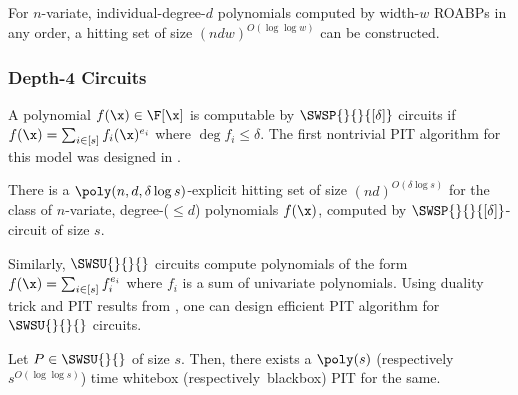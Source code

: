\begin{theorem} \label{thm:roabp-blackbox-pit}
For $n$-variate, individual-degree-$d$ polynomials computed by width-$w$ ROABPs in any order, a hitting set of size $(ndw)^{O(\log \log w)}$ can be constructed.
\end{theorem}

\subsubsection*{Depth-4 Circuits}

A polynomial $f(\x) \in \F[\x]$ is computable by $\SWSP{}{}{[\delta]}$ circuits if $ f(\x) = \sum_{i \in [s]} f_i(\x)^{e_i}$ where $\deg f_i \leq \delta$. The first nontrivial PIT algorithm for this model was designed in \cite{forbes2015deterministic}.

\begin{theorem} \label{thm:swsp-hs}
There is a $\poly(n,d, \delta \log s)$-explicit hitting set of size $(nd)^{O(\delta \log s)}$ for the class of $n$-variate, degree-($\le d$) polynomials $f(\x)$, computed by $\SWSP{}{}{[\delta]}$-circuit of size $s$.
\end{theorem}

Similarly, $\SWSU{}{}{}$ circuits compute polynomials of the form $f(\x) = \sum_{ i \in [s] } f_i^{e_i}$ where $f_i$ is a sum of univariate polynomials. Using duality trick \cite{saxena2008diagonal} and PIT results from \cite{raz2005deterministic,gurjarARO}, one can design efficient PIT algorithm for $\SWSU{}{}{}$ circuits.

\begin{lemma} \label{lem:swsu-hs}
Let  $P \in \SWSU{}{}$ of size $s$. Then, there exists a $\poly(s)$ (respectively~$s^{O(\log \log s)}$) time whitebox (respectively~blackbox) PIT for the same.
\end{lemma}

